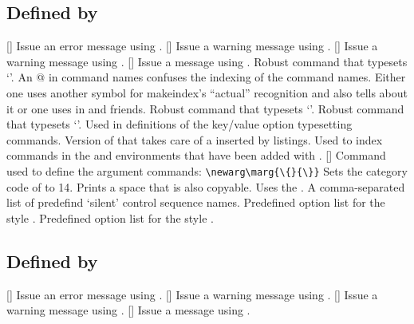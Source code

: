 \documentclass[load-preamble]{cnltx-doc}
\makeatletter
\def\cnltxexample{\cnltx@package@name@format{cnltx-example}}
\def\cnltxdoc{\cnltx@package@name@format{cnltx-doc}}
\makeatother
\begin{document}
\subsection{Defined by \cnltxexample}

\begin{commands}
  []
    Issue an error message using .
  []
    Issue a warning message using .
    []
    Issue a warning message using .
  []
    Issue a message using .
    Robust command that typesets `\at'.  An @ in command names confuses the
    indexing of the command names.  Either one uses another symbol for
    makeindex's ``actual'' recognition and also tells  about it
    or one uses  in  and friends.
    Robust command that typesets `\bang'.
    Robust command that typesets `\equal'.
    Used in definitions of the key/value option typesetting commands.
    Version of  that takes care of a  inserted
    by listings.  Used to index commands in the  and
     environments that have been added with .
  []
    Command used to define the argument commands:
    \lstinline[style=cnltx]+\newarg\marg{\{}{\}}+
    Sets the category code of \code{\%} to 14.
    Prints a space that is also copyable.  Uses the .
    A comma-separated list of predefind `silent' control sequence names.
    Predefined option list for the  style .
    Predefined option list for the  style .
\end{commands}

\subsection{Defined by \cnltxdoc}

\begin{commands}
  []
    Issue an error message using .
  []
    Issue a warning message using .
    []
    Issue a warning message using .
  []
    Issue a message using .
\end{commands}
  
\printindex
\end{document}
